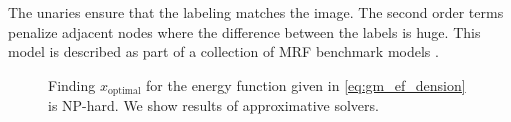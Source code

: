 The unaries ensure that the labeling matches the image.
The second order terms penalize adjacent nodes where the difference
between the labels is huge.
This model is described as part of a collection of MRF benchmark models \citep{szeliski_2008_pami}.




\begin{figure}[H]
    \centering
    \caption[Energy based truncated denoising]{
        Finding $x_{\text{optimal}} $ for the energy function given
        in \cref{eq:gm_ef_dension} is NP-hard. We show results of approximative solvers.
}
\end{figure}
